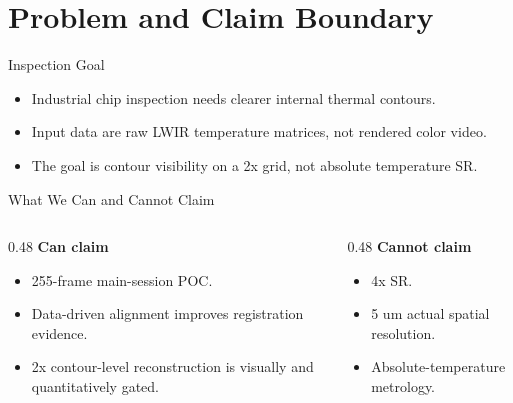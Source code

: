 \section{Problem and Claim Boundary}

\begin{frame}{Inspection Goal}
  \begin{itemize}
    \item Industrial chip inspection needs clearer internal thermal contours.
    \item Input data are raw LWIR temperature matrices, not rendered color video.
    \item The goal is contour visibility on a 2x grid, not absolute temperature SR.
  \end{itemize}
\end{frame}

\begin{frame}{What We Can and Cannot Claim}
  \begin{columns}
    \begin{column}{0.48\textwidth}
      \textbf{Can claim}
      \begin{itemize}
        \item 255-frame main-session POC.
        \item Data-driven alignment improves registration evidence.
        \item 2x contour-level reconstruction is visually and quantitatively gated.
      \end{itemize}
    \end{column}
    \begin{column}{0.48\textwidth}
      \textbf{Cannot claim}
      \begin{itemize}
        \item 4x SR.
        \item 5 um actual spatial resolution.
        \item Absolute-temperature metrology.
      \end{itemize}
    \end{column}
  \end{columns}
\end{frame}

